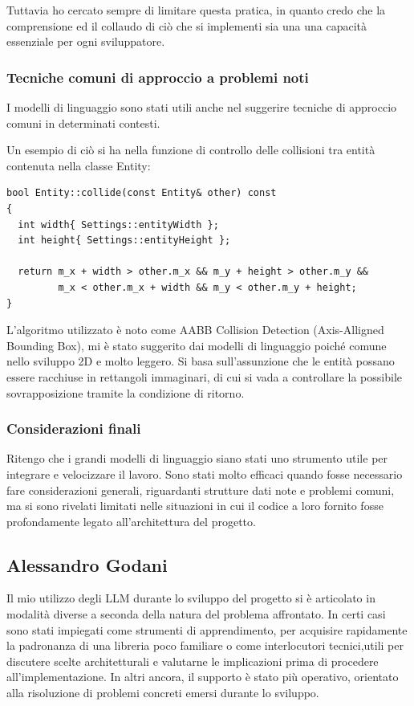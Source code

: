 \documentclass[a4paper,11pt]{article}
\begin{document}
Tuttavia ho cercato sempre di limitare questa pratica, in quanto credo che la comprensione ed il collaudo di ciò che si implementi sia una una capacità essenziale per ogni sviluppatore. 

\subsubsection{Tecniche comuni di approccio a problemi noti}

I modelli di linguaggio sono stati utili anche nel suggerire tecniche di approccio comuni in determinati contesti.

Un esempio di ciò si ha nella funzione di controllo delle collisioni tra entità contenuta nella classe Entity:
\begin{verbatim}
bool Entity::collide(const Entity& other) const
{
  int width{ Settings::entityWidth };
  int height{ Settings::entityHeight };
  
  return m_x + width > other.m_x && m_y + height > other.m_y &&
         m_x < other.m_x + width && m_y < other.m_y + height;
}
\end{verbatim}
L'algoritmo utilizzato è noto come AABB Collision Detection (Axis-Alligned Bounding Box), mi è stato suggerito dai modelli di linguaggio poiché comune nello sviluppo 2D e molto leggero.
Si basa sull'assunzione che le entità possano essere racchiuse in rettangoli immaginari, di cui si vada a controllare la possibile sovrapposizione tramite la condizione di ritorno.

\subsubsection{Considerazioni finali}

Ritengo che i grandi modelli di linguaggio siano stati uno strumento utile per integrare e velocizzare il lavoro.
Sono stati molto efficaci quando fosse necessario fare considerazioni generali, riguardanti strutture dati note e problemi comuni, ma si sono rivelati limitati nelle situazioni in cui il codice a loro fornito fosse profondamente legato all'architettura del progetto.

\subsection{Alessandro Godani}

Il mio utilizzo degli LLM durante lo sviluppo del progetto si è articolato in modalità
diverse a seconda della natura del problema affrontato. In certi casi sono stati
impiegati come strumenti di apprendimento, per acquisire rapidamente la padronanza
di una libreria poco familiare o come interlocutori tecnici,utili per discutere
scelte architetturali e valutarne le implicazioni prima di procedere all'implementazione. 
In altri ancora, il supporto è stato più operativo, orientato alla risoluzione di 
problemi concreti emersi durante lo sviluppo.
\end{document}
